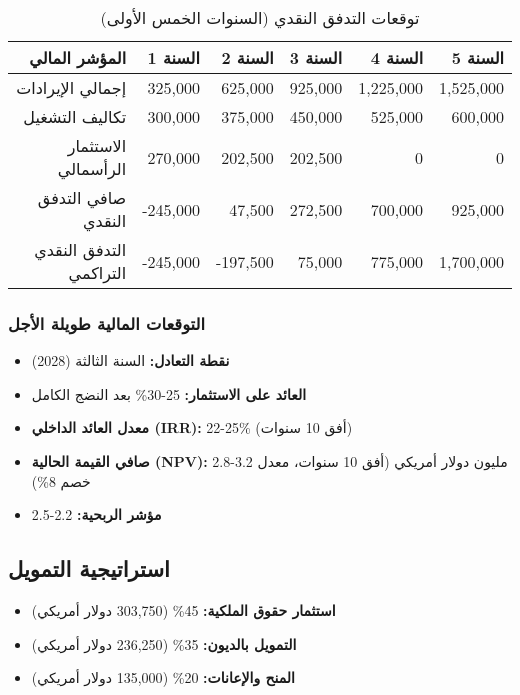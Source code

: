 \begin{table}[h]
\centering
\begin{tabular}{|r|r|r|r|r|r|}
\hline
\textbf{المؤشر المالي} & \textbf{السنة 1} & \textbf{السنة 2} & \textbf{السنة 3} & \textbf{السنة 4} & \textbf{السنة 5} \\
\hline
إجمالي الإيرادات & 325,000 & 625,000 & 925,000 & 1,225,000 & 1,525,000 \\
تكاليف التشغيل & 300,000 & 375,000 & 450,000 & 525,000 & 600,000 \\
الاستثمار الرأسمالي & 270,000 & 202,500 & 202,500 & 0 & 0 \\
\hline
صافي التدفق النقدي & -245,000 & 47,500 & 272,500 & 700,000 & 925,000 \\
التدفق النقدي التراكمي & -245,000 & -197,500 & 75,000 & 775,000 & 1,700,000 \\
\hline
\end{tabular}
\caption{توقعات التدفق النقدي (السنوات الخمس الأولى)}
\end{table}

\subsubsection{التوقعات المالية طويلة الأجل}
\begin{itemize}
    \item \textbf{نقطة التعادل:} السنة الثالثة (2028)
    \item \textbf{العائد على الاستثمار:} 25-30\% بعد النضج الكامل
    \item \textbf{معدل العائد الداخلي (IRR):} 22-25\% (أفق 10 سنوات)
    \item \textbf{صافي القيمة الحالية (NPV):} 2.8-3.2 مليون دولار أمريكي (أفق 10 سنوات، معدل خصم 8\%)
    \item \textbf{مؤشر الربحية:} 2.2-2.5
\end{itemize}

\subsection{استراتيجية التمويل}
\begin{itemize}
    \item \textbf{استثمار حقوق الملكية:} 45\% (303,750 دولار أمريكي)
    \item \textbf{التمويل بالديون:} 35\% (236,250 دولار أمريكي)
    \item \textbf{المنح والإعانات:} 20\% (135,000 دولار أمريكي)
\end{itemize}

